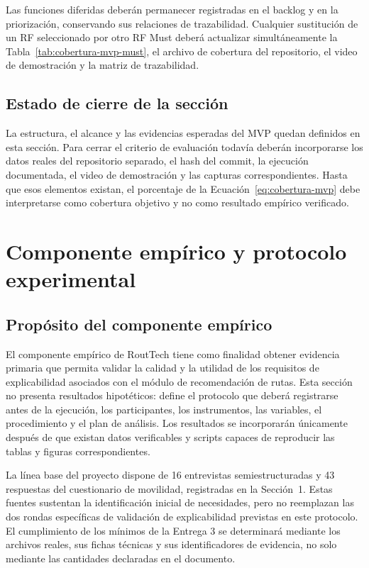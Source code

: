 \documentclass[12pt,a4paper]{article}
\begin{document}
Las funciones diferidas deberán permanecer registradas en el backlog y en la priorización, conservando sus relaciones de trazabilidad. Cualquier sustitución de un RF seleccionado por otro RF Must deberá actualizar simultáneamente la Tabla~\ref{tab:cobertura-mvp-must}, el archivo de cobertura del repositorio, el video de demostración y la matriz de trazabilidad.

\subsection{Estado de cierre de la sección}

La estructura, el alcance y las evidencias esperadas del MVP quedan definidos en esta sección. Para cerrar el criterio de evaluación todavía deberán incorporarse los datos reales del repositorio separado, el hash del commit, la ejecución documentada, el video de demostración y las capturas correspondientes. Hasta que esos elementos existan, el porcentaje de la Ecuación~\ref{eq:cobertura-mvp} debe interpretarse como cobertura objetivo y no como resultado empírico verificado.




\section{Componente empírico y protocolo experimental}\label{sec:componente-empirico}

\subsection{Propósito del componente empírico}

El componente empírico de RoutTech tiene como finalidad obtener evidencia primaria que permita validar la calidad y la utilidad de los requisitos de explicabilidad asociados con el módulo de recomendación de rutas. Esta sección no presenta resultados hipotéticos: define el protocolo que deberá registrarse antes de la ejecución, los participantes, los instrumentos, las variables, el procedimiento y el plan de análisis. Los resultados se incorporarán únicamente después de que existan datos verificables y scripts capaces de reproducir las tablas y figuras correspondientes.

La línea base del proyecto dispone de 16 entrevistas semiestructuradas y 43 respuestas del cuestionario de movilidad, registradas en la Sección~1. Estas fuentes sustentan la identificación inicial de necesidades, pero no reemplazan las dos rondas específicas de validación de explicabilidad previstas en este protocolo. El cumplimiento de los mínimos de la Entrega 3 se determinará mediante los archivos reales, sus fichas técnicas y sus identificadores de evidencia, no solo mediante las cantidades declaradas en el documento.
\end{document}
